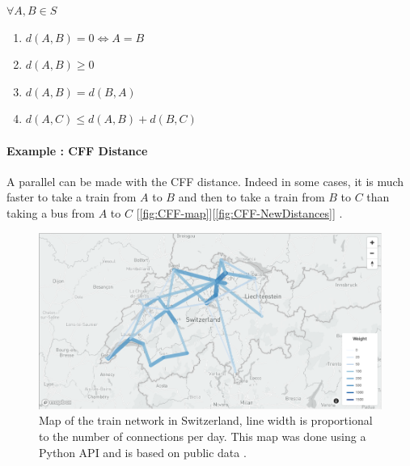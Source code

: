 \documentclass[a4paper,11pt,twoside=semi,openright]{report}
\begin{document}
$\forall A,B \in S$
\begin{enumerate}
\item $d(A,B) = 0 \Leftrightarrow A = B$
\item $d(A,B) \geq 0$
\item $d(A,B) = d(B,A)$
 \color{red} \item$d(A, C) \leq d(A,B) + d(B,C)$ \color{black}
\end{enumerate}

\paragraph{Example : CFF Distance}
A parallel can be made with the CFF distance. Indeed in some cases, it is much
faster to take a train from $A$ to $B$ and then to take a train from $B$ to $C$
than taking a bus from $A$ to $C$ [\autoref{fig:CFF-map}][\autoref{fig:CFF-NewDistances}] . 

\begin{figure}[!h] 
\centering
\includegraphics[width=450pt]{figures/mapCFF}
\caption{Map of the train network in Switzerland, line width is proportional to
 the number of connections per day. This map was done using a Python API \cite{MapBox} and is based on public data \cite{OpenData}. } \label{fig:CFF-map}
\end{figure}
\end{document}
